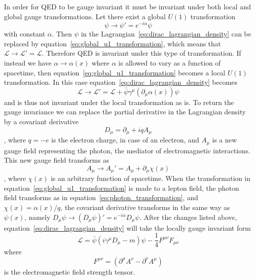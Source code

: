 In order for QED to be gauge invariant it must be invariant under both local and global gauge transformations.
Let there exist a global $U\left(1\right)$ transformation
\begin{equation}\label{eq:global_u1_transformation}
	\psi\rightarrow\psi'=e^{-i\alpha}\psi
\end{equation}
with constant $\alpha$.
Then $\psi$ in the Lagrangian~\ref{eq:dirac_lagrangian_density} can be replaced by equation~\ref{eq:global_u1_transformation}, which means that $\mathcal{L}\rightarrow\mathcal{L}'=\mathcal{L}$.
Therefore QED is invariant under this type of transformation.
If instead we have $\alpha\rightarrow\alpha\left(x\right)$ where $\alpha$ is allowed to vary as a function of spacetime, then equation~\ref{eq:global_u1_transformation} becomes a local $U\left(1\right)$ transformation.
In this case equation~\ref{eq:dirac_lagrangian_density} becomes
\begin{equation}\label{eq:local_transformation}
	\mathcal{L}\rightarrow\mathcal{L}'=\mathcal{L}+\bar{\psi}\gamma^{\mu}\left(\partial_{\mu}\alpha\left(x\right)\right)\psi
\end{equation}
and is thus not invariant under the local transformation as is.
To return the gauge invariance we can replace the partial derivative in the Lagrangian density by a covariant derivative
\begin{equation}\label{eq:covariant_derivative}
	D_{\mu}=\partial_{\mu}+iqA_{\mu}
\end{equation}
, where $q=-e$ is the electron charge, in case of an electron, and $A_{\mu}$ is a new gauge field representing the photon, the mediator of electromagnetic interactions.
This new gauge field transforms as
\begin{equation}\label{eq:photon_transformation}
	A_{\mu}{\rightarrow}A_{\mu}'=A_{\mu}+\partial_{\mu}\chi\left(x\right)
\end{equation}
, where $\chi\left(x\right)$ is an arbitrary function of spacetime.
When the transformation in equation~\ref{eq:global_u1_transformation} is made to a lepton field, the photon field transforms as in equation~\ref{eq:photon_transformation}, and $\chi\left(x\right)=\alpha\left(x\right)/q$, the covariant derivative transforms in the same way as $\psi\left(x\right)$, namely $D_{\mu}\psi\rightarrow\left(D_{\mu}\psi\right)'=e^{-i\alpha}D_{\mu}\psi$.
After the changes listed above, equation~\ref{eq:dirac_lagrangian_density} will take the locally gauge invariant form
\begin{equation}\label{eq:dirac_lagrangian_density_local_invariant}
	\mathcal{L}=\bar{\psi}\left(i\gamma^{\mu}D_{\mu}-m\right)\psi-\frac{1}{4}F^{\mu\nu}F_{\mu\nu}
\end{equation}
where
\begin{equation}\label{eq:electromagnetic_field_strength_tensor}
	F^{\mu\nu}=\left(\partial^{\mu}A^{\nu}-\partial^{\nu}A^{\mu}\right)
\end{equation}
is the electromagnetic field strength tensor.

